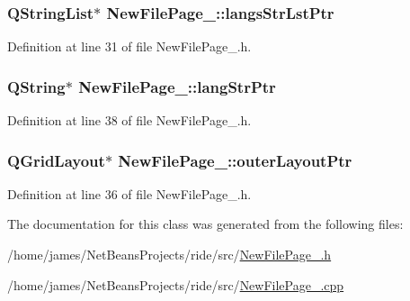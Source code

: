 \hypertarget{class_new_file_page__1_acb912634d0accb1d1fc2cb1f5c2dea78}{
\subsubsection[{langs\-Str\-Lst\-Ptr}]{\setlength{\rightskip}{0pt plus 5cm}Q\-String\-List$\ast$ New\-File\-Page\-\_\-::langs\-Str\-Lst\-Ptr\hspace{0.3cm}{\ttfamily [private]}}}\label{class_new_file_page__1_acb912634d0accb1d1fc2cb1f5c2dea78}


Definition at line 31 of file New\-File\-Page\-\_.\-h.

\hypertarget{class_new_file_page__1_a28c75fb5624badef97ed17d38f0c598a}{
\subsubsection[{lang\-Str\-Ptr}]{\setlength{\rightskip}{0pt plus 5cm}Q\-String$\ast$ New\-File\-Page\-\_\-::lang\-Str\-Ptr\hspace{0.3cm}{\ttfamily [private]}}}\label{class_new_file_page__1_a28c75fb5624badef97ed17d38f0c598a}


Definition at line 38 of file New\-File\-Page\-\_.\-h.

\hypertarget{class_new_file_page__1_a161e24cf061ed28e5ee5f61e5087a9fc}{
\subsubsection[{outer\-Layout\-Ptr}]{\setlength{\rightskip}{0pt plus 5cm}Q\-Grid\-Layout$\ast$ New\-File\-Page\-\_\-::outer\-Layout\-Ptr\hspace{0.3cm}{\ttfamily [private]}}}\label{class_new_file_page__1_a161e24cf061ed28e5ee5f61e5087a9fc}


Definition at line 36 of file New\-File\-Page\-\_.\-h.



The documentation for this class was generated from the following files\-:\begin{DoxyCompactItemize}
\item 
/home/james/\-Net\-Beans\-Projects/ride/src/\hyperlink{_new_file_page__1_8h}{New\-File\-Page\-\_.\-h}\item 
/home/james/\-Net\-Beans\-Projects/ride/src/\hyperlink{_new_file_page__1_8cpp}{New\-File\-Page\-\_.\-cpp}\end{DoxyCompactItemize}
